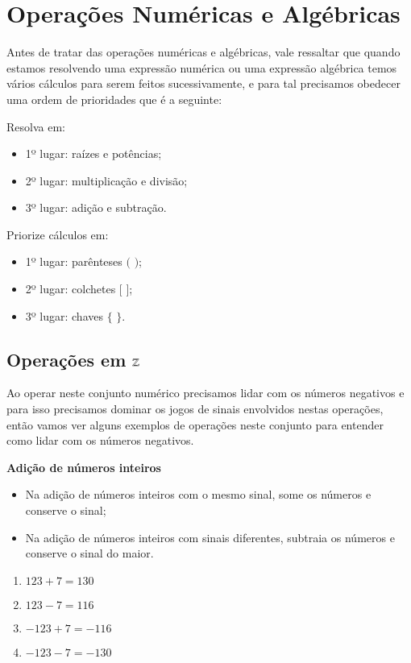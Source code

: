  \chapter{Operações Numéricas e Algébricas}

 Antes de tratar das operações numéricas e algébricas, vale ressaltar que quando estamos resolvendo uma expressão numérica ou uma expressão algébrica temos vários cálculos para serem feitos sucessivamente, e para tal precisamos obedecer uma ordem de prioridades que é a seguinte:

\begin{multicols}{2}
Resolva em:
\begin{itemize}
\item 1º lugar: raízes e potências;
\item 2º lugar: multiplicação e divisão;
\item 3º lugar: adição e subtração.
\end{itemize}

Priorize cálculos em:
\begin{itemize}
\item 1º lugar: parênteses $($ $)$;
\item 2º lugar: colchetes $[$ $]$;
\item 3º lugar: chaves $\{$ $\}$.
\end{itemize}
\end{multicols}

 \section{Operações em \texorpdfstring{$\mathbb{Z}$}{Z}}

 Ao operar neste conjunto numérico precisamos lidar com os números negativos e para isso precisamos dominar os jogos de sinais envolvidos nestas operações, então vamos ver alguns exemplos de operações neste conjunto para entender como lidar com os números negativos.

 \textbf{Adição de números inteiros}

 \begin{itemize}
  \item Na adição de números inteiros com o mesmo sinal, some os números e conserve o sinal;
  \item Na adição de números inteiros com sinais diferentes, subtraia os números e conserve o sinal do maior.
 \end{itemize}

  \begin{enumerate}[1)]
   \item $123 + 7= 130$
   \item $123 - 7= 116$
   \item $-123 + 7 = -116$
   \item $-123 - 7 = -130$
 \end{enumerate}

